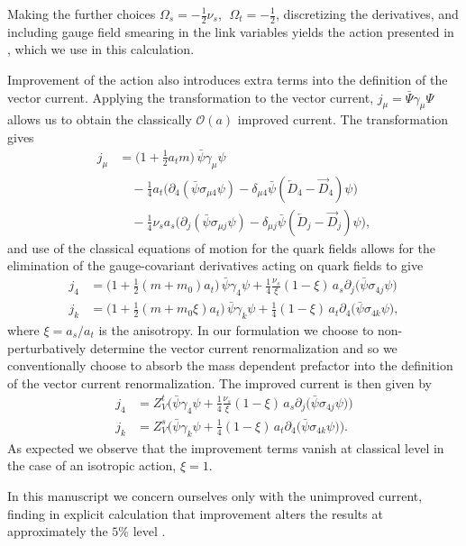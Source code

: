 Making the further choices $\Omega_s = -\frac{1}{2}\nu_s$, $\;\Omega_t = -\frac{1}{2}$, discretizing the derivatives, and including gauge field smearing in the link variables yields the action presented in \cite{Edwards:2008ja}, which we use in this calculation. 

Improvement of the action also introduces extra terms into the definition of the vector current. Applying the transformation to the vector current, $j_\mu = \bar{\Psi}\gamma_\mu \Psi$ allows us to obtain the classically $\mathcal{O}(a)$ improved current. The transformation gives 
\begin{align*}
	j_\mu &= \big(1 + \tfrac{1}{2} a_t m \big)\, \bar{\psi} \gamma_\mu \psi    \\
	&\quad- \tfrac{1}{4} a_t \big( \partial_4 (\bar{\psi} \sigma_{\mu 4} \psi)  - \delta_{\mu 4} \bar{\psi} ( \overleftarrow{D}_{\!4} - \overrightarrow{D}_{\!4})\psi \big) \\
	&\quad- \tfrac{1}{4} \nu_s a_s \big( \partial_j (\bar{\psi} \sigma_{\mu j} \psi)  - \delta_{\mu j} \bar{\psi} ( \overleftarrow{D}_{\!j} - \overrightarrow{D}_{\!j})\psi \big),
\end{align*} 
and use of the classical equations of motion for the quark fields allows for the elimination of the gauge-covariant derivatives acting on quark fields to give
\begin{align*}
j_4 &= \big( 1 + \tfrac{1}{2}(m+m_0)a_t \big)\,  \bar{\psi}\gamma_4 \psi + \tfrac{1}{4} \tfrac{\nu_s}{\xi} ( 1- \xi) \, a_s \partial_j \big( \bar{\psi}\sigma_{4j} \psi\big)  \\
j_k &= \big( 1 + \tfrac{1}{2}(m+m_0 \xi)a_t \big)\,  \bar{\psi}\gamma_k \psi + \tfrac{1}{4} ( 1 - \xi) \, a_t \partial_4 \big( \bar{\psi}\sigma_{4k} \psi\big),
\end{align*}
where $\xi = a_s/a_t$ is the anisotropy. In our formulation we choose to non-perturbatively determine the vector current renormalization and so we conventionally choose to absorb the mass dependent prefactor into the definition of the vector current renormalization. The improved current is then given by 
\begin{align}
j_4 &= Z_V^t \Big(   \bar{\psi}\gamma_4 \psi + \tfrac{1}{4} \tfrac{\nu_s}{\xi} ( 1- \xi) \, a_s \partial_j \big( \bar{\psi}\sigma_{4j} \psi\big)  \Big) \nonumber \\
j_k &= Z_V^s \Big(   \bar{\psi}\gamma_k \psi + \tfrac{1}{4} ( 1 - \xi) \, a_t \partial_4 \big( \bar{\psi}\sigma_{4k} \psi\big) \Big).
\end{align}
As expected we observe that the improvement terms vanish at classical level in the case of an isotropic action, $\xi = 1$.

In this manuscript we concern ourselves only with the unimproved current, finding in explicit calculation that improvement alters the results at approximately the $5\%$ level \cite{Shultz:2015pfa}. 



